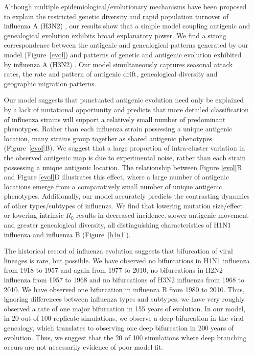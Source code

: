\documentclass[11pt,oneside,letterpaper]{article}
\begin{document}
Although multiple epidemiological/evolutionary mechanisms have been proposed to explain the restricted genetic diversity and rapid population turnover of influenza A (H3N2) \cite{Ferguson03,Tria05,Koelle06,Recker07}, our results show that a simple model coupling antigenic and genealogical evolution exhibits broad explanatory power.  We find a strong correspondence between the antigenic and genealogical patterns generated by our model (Figure~\ref{evol}) and patterns of genetic and antigenic evolution exhibited by influenza A (H3N2) \cite{Fitch97,Smith04}.  Our model simultaneously captures seasonal attack rates, the rate and pattern of antigenic drift, genealogical diversity and geographic migration patterns.  

Our model suggests that punctuated antigenic evolution need only be explained by a lack of mutational opportunity and predicts that more detailed classification of influenza strains will support a relatively small number of predominant phenotypes.  Rather than each influenza strain possessing a unique antigenic location, many strains group together as shared antigenic phenotypes (Figure~\ref{evol}B).  We suggest that a large proportion of intra-cluster variation in the observed antigenic map is due to experimental noise, rather than each strain possessing a unique antigenic location.  The relationship between Figure \ref{evol}B and Figure \ref{evol}D illustrates this effect, where a large number of antigenic locations emerge from a comparatively small number of unique antigenic phenotypes.  Additionally, our model accurately predicts the contrasting dynamics of other types/subtypes of influenza.  We find that lowering mutation size/effect or lowering intrinsic $R_0$ results in decreased incidence, slower antigenic movement and greater genealogical diversity, all distinguishing characteristics of H1N1 influenza and influenza B (Figure~\ref{h1n1}).  

The historical record of influenza evolution suggests that bifurcation of viral lineages is rare, but possible.  We have observed no bifurcations in H1N1 influenza from 1918 to 1957 and again from 1977 to 2010, no bifurcations in H2N2 influenza from 1957 to 1968 and no bifurcations of H3N2 influenza from 1968 to 2010.  We have observed one bifurcation in influenza B from 1980 to 2010.  Thus, ignoring differences between influenza types and subtypes, we have very roughly observed a rate of one major bifurcation in 155 years of evolution.  In our model, in 20 out of 100 replicate simulations, we observe a deep bifurcation in the viral genealogy, which translates to observing one deep bifurcation in 200 years of evolution.  Thus, we suggest that the 20 of 100 simulations where deep branching occurs are not necessarily evidence of poor model fit.
\end{document}
